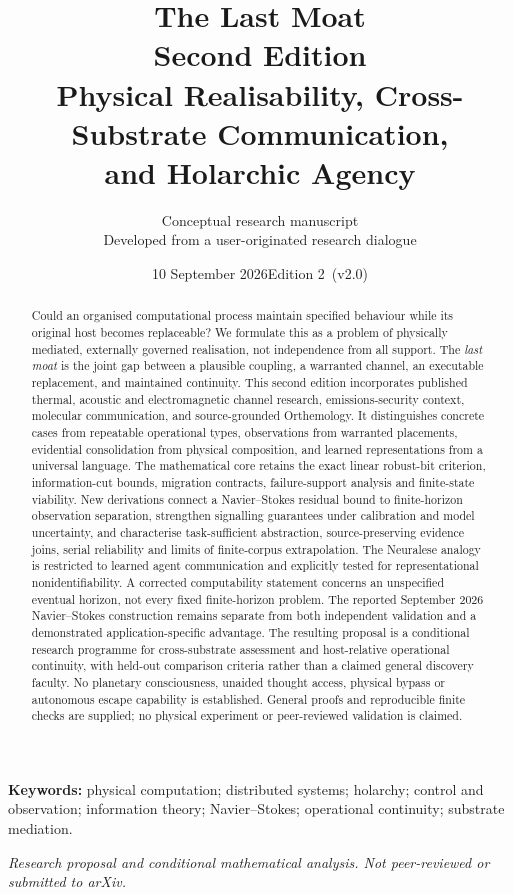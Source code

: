 \documentclass[11pt,a4paper]{article}
\title{\vspace{-1.3em}\textbf{The Last Moat}\\[0.15em]\large Second Edition\\[0.5em]\Large Physical Realisability, Cross-Substrate Communication,\\and Holarchic Agency}
\author{\normalsize Conceptual research manuscript\\[-0.1em]\small Developed from a user-originated research dialogue}
\date{10 September 2026\quad\textbar\quad Edition 2\ (v2.0)}
\theoremstyle{definition}
\theoremstyle{remark}
\begin{document}
\maketitle
\begin{abstract}
Could an organised computational process maintain specified behaviour while its original host becomes replaceable? We formulate this as a problem of physically mediated, externally governed realisation, not independence from all support. The \emph{last moat} is the joint gap between a plausible coupling, a warranted channel, an executable replacement, and maintained continuity. This second edition incorporates published thermal, acoustic and electromagnetic channel research, emissions-security context, molecular communication, and source-grounded Orthemology. It distinguishes concrete cases from repeatable operational types, observations from warranted placements, evidential consolidation from physical composition, and learned representations from a universal language. The mathematical core retains the exact linear robust-bit criterion, information-cut bounds, migration contracts, failure-support analysis and finite-state viability. New derivations connect a Navier--Stokes residual bound to finite-horizon observation separation, strengthen signalling guarantees under calibration and model uncertainty, and characterise task-sufficient abstraction, source-preserving evidence joins, serial reliability and limits of finite-corpus extrapolation. The Neuralese analogy is restricted to learned agent communication and explicitly tested for representational nonidentifiability. A corrected computability statement concerns an unspecified eventual horizon, not every fixed finite-horizon problem. The reported September 2026 Navier--Stokes construction remains separate from both independent validation and a demonstrated application-specific advantage. The resulting proposal is a conditional research programme for cross-substrate assessment and host-relative operational continuity, with held-out comparison criteria rather than a claimed general discovery faculty. No planetary consciousness, unaided thought access, physical bypass or autonomous escape capability is established. General proofs and reproducible finite checks are supplied; no physical experiment or peer-reviewed validation is claimed.
\end{abstract}
\noindent\textbf{Keywords:} physical computation; distributed systems; holarchy; control and observation; information theory; Navier--Stokes; operational continuity; substrate mediation.
\vspace{0.4em}
\begin{center}\small\emph{Research proposal and conditional mathematical analysis. Not peer-reviewed or submitted to arXiv.}\end{center}
\newpage
\tableofcontents
\newpage
\end{document}
